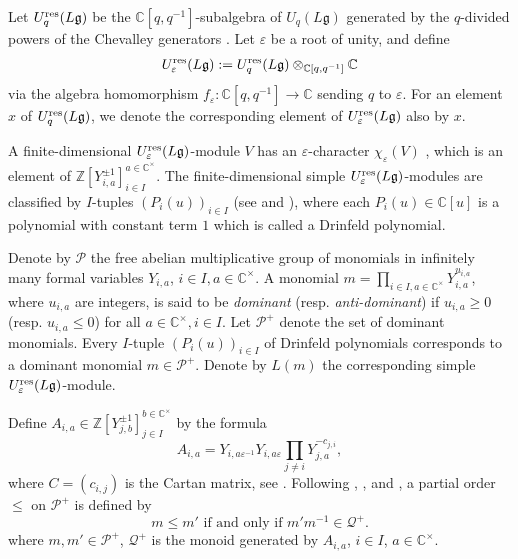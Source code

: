 \documentclass[11pt, reqno]{amsart}
\theoremstyle{plain}
\theoremstyle{definition}
\numberwithin{equation}{section}
\newcommand{\res}{{\rm res}}
\begin{document}
Let $U_q^{\res}({L\mathfrak{g}})$ be the $\mathbb{C}[q,q^{-1}]$-subalgebra of $U_q(L\mathfrak{g})$ generated by the $q$-divided powers of the Chevalley generators {\cite[Section 1]{CP97}}. Let $\varepsilon$ be a root of unity, and define
\begin{align*}
U_\varepsilon^{\res}({L\mathfrak{g}}):=U_q^{\res}({L\mathfrak{g}}) \otimes_{\mathbb{C}[q, q^{-1}]}\mathbb{C}
\end{align*}
via the algebra homomorphism $f_{\varepsilon}: \mathbb{C}[q, q^{-1}]\rightarrow \mathbb{C}$ sending $q$ to $\varepsilon$. For an element $x$ of $U_q^{\res}({L\mathfrak{g}})$, we denote the corresponding element of $U_\varepsilon^{\res}({L\mathfrak{g}})$ also by $x$.



A finite-dimensional $U_\varepsilon^{\res}({L\mathfrak{g}})$-module $V$ has an $\varepsilon$-character $\chi_{\varepsilon}(V)$ \cite[Section 3]{FM02}, which is an element of $\mathbb{Z}[Y_{i,a}^{\pm1}]_{i\in I}^{a\in\mathbb{C^{\times}}}$. The finite-dimensional simple $U_{\varepsilon}^{\res}(L\mathfrak{g})$-modules are classified by $I$-tuples $(P_i(u))_{i \in I}$ (see \cite[Theorem 8.2]{CP97} and \cite[Theorem 2.4]{FM02}), where each $P_i(u) \in \mathbb{C}[u]$ is a polynomial with constant term $1$ which is called a Drinfeld polynomial. 

Denote by $\mathcal{P}$ the free abelian multiplicative group of monomials in infinitely many formal variables $Y_{i, a}$, $i \in I, a \in \mathbb{C}^{\times}$. A monomial $m=\prod_{i \in I, a \in \mathbb{C}^{\times}} Y_{i, a}^{u_{i, a}}$, where $u_{i, a}$ are integers, is said to be \textit{dominant} (resp. \textit{anti-dominant}) if $u_{i, a} \geq 0$ (resp. $u_{i, a} \leq 0$) for all $a \in \mathbb{C}^{\times}, i \in I$. Let $\mathcal{P}^+$ denote the set of dominant monomials. Every $I$-tuple $(P_i(u))_{i \in I}$ of Drinfeld polynomials corresponds to a dominant monomial $m \in \mathcal{P}^+$. Denote by $L(m)$ the corresponding simple $U_{\varepsilon}^{\res}(L\mathfrak{g})$-module.

Define $A_{i,a}\in \mathbb{Z}[Y_{j,b}^{\pm1}]_{j\in I}^{b\in\mathbb{C}^\times}$ by the formula
\[
A_{i,a}=Y_{i,a\varepsilon^{-1}}Y_{i,a\varepsilon}\prod_{j\neq i}Y_{j,a}^{-c_{j,i}},
\]
where $C=(c_{i,j})$ is the Cartan matrix, see \cite[Section 3.2]{FM02}. Following \cite[Equation (4.3)]{FM01}, \cite[Definition 2.9]{Nak04}, and \cite[Section 2.5]{FM02}, a partial order $\leq$ on $\mathcal{P}^+$ is defined by \[
m\le m' \text { if and only if } m'm^{-1}\in \mathcal{Q}^+.
\]
where $m, m' \in \mathcal{P}^+$, $\mathcal{Q}^{+}$ is the monoid generated by $A_{i,a}$, $i\in I$, $a\in\mathbb C^\times$.
\end{document}
